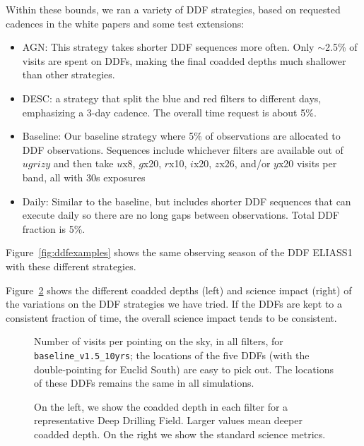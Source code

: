 Within these bounds, we ran a variety of DDF strategies, based on requested cadences in the white papers and some test extensions:
\begin{itemize}
    \item{AGN: This strategy takes shorter DDF sequences more often. Only $\sim$2.5\% of visits are spent on DDFs, making the final coadded depths much shallower than other strategies.}
    \item{DESC: a strategy that split the blue and red filters to different days, emphasizing a 3-day cadence. The overall time request is about 5\%.}
     \item{Baseline:  Our baseline strategy where 5\% of observations are allocated to DDF observations. Sequences include whichever filters are available out of $ugrizy$ and then take $u$x8, $g$x20, $r$x10, $i$x20, $z$x26, and/or $y$x20 visits per band, all with 30s exposures}
    \item{Daily: Similar to the baseline, but includes shorter DDF sequences that can execute daily so there are no long gaps between observations. Total DDF fraction is 5\%.}
\end{itemize}
Figure~\ref{fig:ddfexamples} shows the same observing season of the DDF ELIASS1 with these different strategies. 

Figure~\ref{fig:ddf_differences} shows the different coadded depths (left) and science impact (right) of the variations on the DDF strategies we have tried. If the DDFs are kept to a consistent fraction of time, the overall science impact tends to be consistent.

\begin{figure}
\caption{Number of visits per pointing on the sky, in all filters, for {\tt baseline\_v1.5\_10yrs}; the locations of the five DDFs (with the double-pointing for Euclid South) are easy to pick out. The locations of these DDFs remains the same in all simulations.} \label{fig:ddf_locs}
\end{figure}

\begin{figure}
\caption{On the left, we show the coadded depth in each filter for a representative Deep Drilling Field. Larger values mean deeper coadded depth. On the right we show the standard science metrics.}\label{fig:ddf_differences}
\end{figure}

